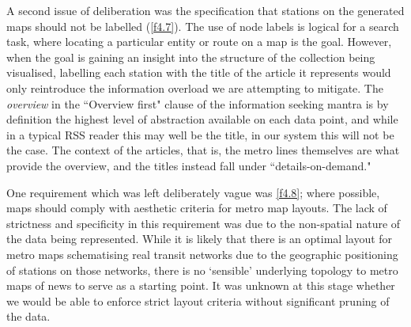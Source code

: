 A second issue of deliberation was the specification that stations on the generated maps should not be labelled (\ref{f4.7}). The use of node labels is logical for a search task, where locating a particular entity or route on a map is the goal. However, when the goal is gaining an insight into the structure of the collection being visualised, labelling each station with the title of the article it represents would only reintroduce the information overload we are attempting to mitigate. The \textit{overview} in the ``Overview first" clause of the information seeking mantra \citep{TheEyesHaveIt} is by definition the highest level of abstraction available on each data point, and while in a typical RSS reader this may well be the title, in our system this will not be the case. The context of the articles, that is, the metro lines themselves are what provide the overview, and the titles instead fall under ``details-on-demand."

One requirement which was left deliberately vague was \ref{f4.8}; where possible, maps should comply with  aesthetic criteria for metro map layouts. The lack of strictness and specificity in this requirement was due to the non-spatial nature of the data being represented. While it is likely that there is an optimal layout for metro maps schematising real transit networks due to the geographic positioning of stations on those networks, there is no `sensible' underlying topology to metro maps of news to serve as a starting point. It was unknown at this stage whether we would be able to enforce strict layout criteria without significant pruning of the data.



